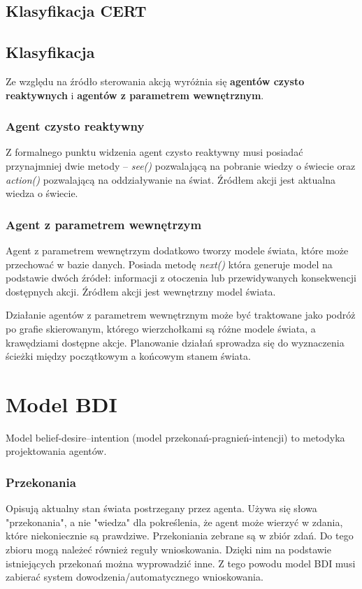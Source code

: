 \subsection{Klasyfikacja CERT}

\subsection{Klasyfikacja }
Ze względu na źródło sterowania akcją wyróżnia się \textbf{agentów czysto reaktywnych} i  \textbf{agentów z parametrem wewnętrznym}. 

\subsubsection{Agent czysto reaktywny}

Z formalnego punktu widzenia agent czysto reaktywny musi posiadać przynajmniej dwie metody – \textit{see()} pozwalającą na pobranie wiedzy o świecie oraz \textit{action()} pozwalającą na oddziaływanie na świat. Źródłem akcji jest aktualna wiedza o świecie.

\subsubsection{Agent z parametrem wewnętrzym}

Agent z parametrem wewnętrzym dodatkowo tworzy modele świata, które może przechować w bazie danych. Posiada metodę \textit{next()} która generuje model na podstawie dwóch źródeł: informacji z otoczenia lub przewidywanych konsekwencji dostępnych akcji. Źródłem akcji jest wewnętrzny model świata. 

Działanie agentów z parametrem wewnętrznym może być traktowane jako podróż po grafie skierowanym, którego wierzchołkami są różne modele świata, a krawędziami dostępne akcje. Planowanie działań sprowadza się do wyznaczenia ścieżki między początkowym a końcowym stanem świata.

\section{Model BDI}
Model belief-desire–intention (model przekonań-pragnień-intencji) to metodyka projektowania agentów. 

\subsubsection{Przekonania}
Opisują aktualny stan świata postrzegany przez agenta. Używa się słowa "przekonania", a nie "wiedza" dla pokreślenia, że agent może wierzyć w zdania, które niekoniecznie są prawdziwe. Przekoniania zebrane są w zbiór zdań. Do tego zbioru mogą należeć również reguły wnioskowania. Dzięki nim na podstawie istniejących przekonań można wyprowadzić inne. Z tego powodu model BDI musi zabierać system dowodzenia/automatycznego wnioskowania.


